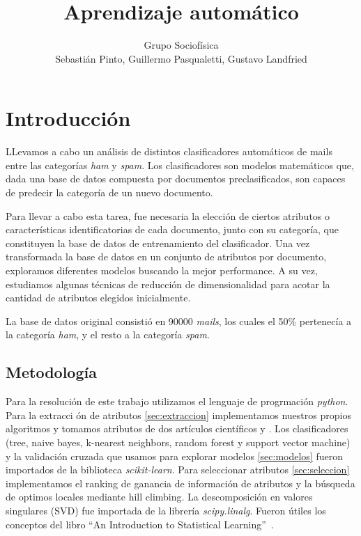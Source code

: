 \documentclass[a4paper,10pt]{article}
\title{Aprendizaje autom\'atico}
\author{Grupo Sociof\'isica \\
Sebasti\'an Pinto, Guillermo Pasqualetti, Gustavo Landfried}
\begin{document}
\maketitle

\section{Introducci\'on}

\par LLevamos a cabo un análisis de distintos clasificadores automáticos de mails entre las categorías \emph{ham} y \emph{spam}. Los clasificadores son modelos matemáticos que, dada una base de datos compuesta por documentos preclasificados, son capaces de predecir la categoría de un nuevo documento. 
\par Para llevar a cabo esta tarea, fue necesaria la elección de ciertos atributos o características identificatorias de cada documento, junto con su categoría, que constituyen la base de datos de entrenamiento del clasificador. Una vez transformada la base de datos en un conjunto de atributos por documento, exploramos diferentes modelos buscando la mejor performance. A su vez, estudiamos algunas técnicas de reducción de dimensionalidad para acotar la cantidad de atributos elegidos inicialmente.
\par La base de datos original consistió en 90000 \emph{mails}, los cuales el 50\% pertenecía a la categoría \emph{ham}, y el resto a la categoría \emph{spam}.

\subsection{Metodología}

\par Para la resolución de este trabajo utilizamos el lenguaje de progrmaci\'on \emph{python}. Para la extracci \'on de atributos \ref{sec:extraccion} implementamos nuestros propios algoritmos y tomamos atributos de dos art\'iculos cient\'ificos \cite{Gunal} y \cite{Vaughan}. Los clasificadores (tree, naive bayes, k-nearest neighbors, random forest y support vector machine) y la validaci\'on cruzada que usamos para explorar modelos \ref{sec:modelos} fueron importados de la biblioteca \emph{scikit-learn}\cite{sklearn}. Para seleccionar atributos \ref{sec:seleccion} implementamos el ranking de ganancia de informaci\'on de atributos y la b\'usqueda de optimos locales mediante hill climbing. La descomposición en valores singulares (SVD) fue importada de la librería \emph{scipy.linalg}\cite{scipy}. Fueron \'utiles los conceptos del libro ``An Introduction to Statistical Learning''~\cite{james_hastie_tibshirani}.
\end{document}
